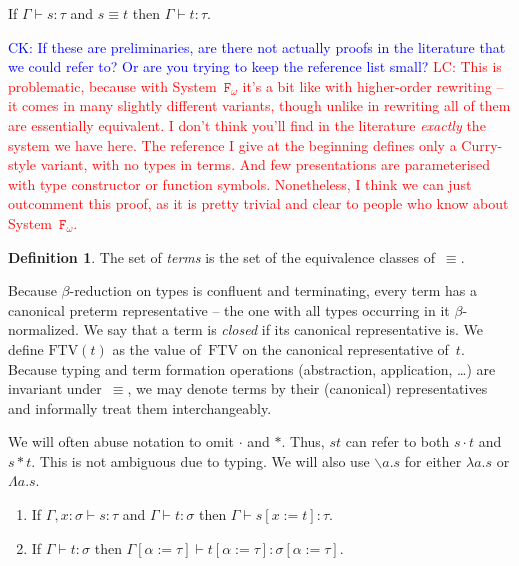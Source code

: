 \documentclass[a4paper,UKenglish,cleveref,autoref,numberwithinsect]{lipics-v2019}
\theoremstyle{definition}
\newtheorem{defn}[theorem]{Definition}
\newcommand{\Fomega}{\mathtt{F}_\omega}
\newcommand{\abstraction}[2]{\backslash #1.#2}
\newcommand{\app}[2]{#1 \cdot #2}
\newcommand{\tapp}[2]{#1 * #2}
\newcommand{\subst}[2]{#1:=#2}
\newcommand{\abs}[2]{\lambda #1.#2}
\newcommand{\tabs}[2]{\Lambda #1.#2}
\newcommand{\FTV}{\mathrm{FTV}}
\newcommand{\proves}{\vdash}
\newcommand{\CK}[1]{\textcolor{blue}{CK: #1}}
\newcommand{\LC}[1]{\textcolor{red}{LC: #1}}
\begin{document}
\begin{lemma}
  If $\Gamma \vdash s : \tau$ and $s \equiv t$ then $\Gamma \vdash t :
  \tau$.
\end{lemma}

\CK{If these are preliminaries, are there not actually proofs in the
  literature that we could refer to? Or are you trying to keep the
  reference list small?}
\LC{This is problematic, because with System~$\Fomega$ it's a bit like
  with higher-order rewriting -- it comes in many slightly different
  variants, though unlike in rewriting all of them are essentially
  equivalent. I don't think you'll find in the literature
  \emph{exactly} the system we have here. The reference I give at the
  beginning defines only a Curry-style variant, with no types in
  terms. And few presentations are parameterised with type constructor
  or function symbols. Nonetheless, I think we can just outcomment
  this proof, as it is pretty trivial and clear to people who know
  about System~$\Fomega$.}

\begin{defn}\label{def_terms}
  The set of \emph{terms} is the set of the equivalence classes
  of~$\equiv$.
\end{defn}

Because $\beta$-reduction on types is confluent and terminating, every
term has a canonical preterm representative -- the one with all types
occurring in it $\beta$-normalized. We say that a term is
\emph{closed} if its canonical representative is. We define $\FTV(t)$
as the value of~$\FTV$ on the canonical representative of~$t$.
%
Because typing and term formation operations (abstraction,
application, \ldots) are invariant under~$\equiv$, we may denote terms
by their (canonical) representatives and informally treat them
interchangeably.

We will often abuse notation to omit $\cdot$ and $*$. Thus, $s t$ can
refer to both $\app{s}{t}$ and $\tapp{s}{t}$. This is not ambiguous
due to typing. We will also use $\abstraction{a}{s}$ for either
$\abs{a}{s}$ or $\tabs{a}{s}$.

\begin{lemma}
  \begin{enumerate}
  \item If $\Gamma, x : \sigma \proves s : \tau$ and $\Gamma \proves t
    : \sigma$ then $\Gamma \proves s[\subst{x}{t}] : \tau$.
  \item If $\Gamma \proves t : \sigma$ then
    $\Gamma[\subst{\alpha}{\tau}] \proves t[\subst{\alpha}{\tau}] :
    \sigma[\subst{\alpha}{\tau}]$.
  \end{enumerate}
\end{lemma}
\end{document}
